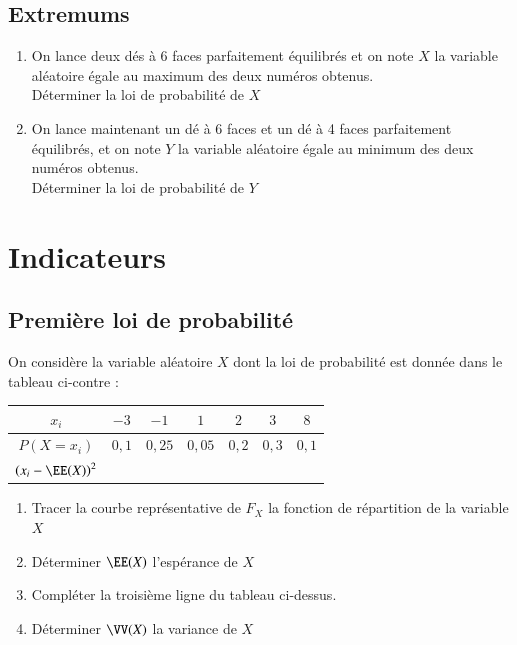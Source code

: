 \documentclass[oneside,12pt]{article}          %
\begin{document}
\subsection{Extremums}
\begin{enumerate}
    \item On lance deux dés à 6 faces parfaitement équilibrés et on note $X$ la variable aléatoire égale au maximum des deux numéros obtenus.\\
    Déterminer la loi de probabilité de $X$
    \item On lance maintenant un dé à 6 faces et un dé à 4 faces parfaitement équilibrés, et on note $Y$ la variable aléatoire égale au minimum des deux numéros obtenus.\\
    Déterminer la loi de probabilité de $Y$
\end{enumerate}



\section{Indicateurs}

\subsection{Première loi de probabilité}
On considère la variable aléatoire $X$ dont la loi de probabilité est donnée dans le tableau ci-contre : 

\begin{center}
\renewcommand{\arraystretch}{1.5} 
\setlength{\tabcolsep}{15pt}
\begin{tabular}{|c|c|c|c|c|c|c|}  \hline
    $x_i$ & $-3$ & $-1$ & $1$ & $2$ & $3$ & $8$ \\ \hline
    $P(X=x_i)$ & $0,1$ & $0,25$ & $0,05$ & $0,2$ & $0,3$ & $0,1$ \\ \hline
    $\left(x_i-\EE(X)\right)^2$ & & & & & & \\ \hline
\end{tabular}
\end{center}
\begin{enumerate}
	\item Tracer la courbe représentative de $F_X$ la fonction de répartition de la variable $X$
    \item Déterminer $\EE(X)$ l'espérance de $X$
    \item Compléter la troisième ligne du tableau ci-dessus.
    \item Déterminer $\VV(X)$ la variance de $X$
\end{enumerate}
\end{document}
